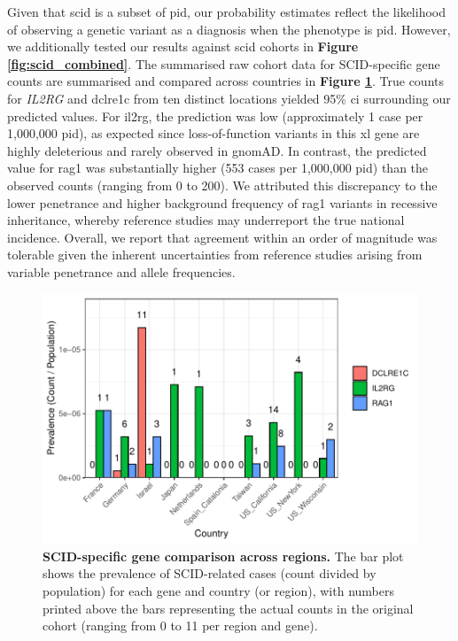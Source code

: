 Given that \ac{scid} is a subset of \ac{pid}, our probability estimates reflect the likelihood of observing a genetic variant as a diagnosis when the phenotype is \ac{pid}. 
However, we additionally tested our results against \ac{scid} cohorts in 
 \textbf{Figure \ref{fig:scid_combined}}.
The summarised raw cohort data for SCID-specific gene counts are summarised and compared across countries in \textbf{Figure \ref{fig:scid_gene_comparison}}.
True counts for \textit{IL2RG} and \ac{dclre1c} from ten distinct locations yielded 95\% \ac{ci} surrounding our predicted values. 
For \ac{il2rg}, the prediction was low (approximately 1 case per 1,000,000 \ac{pid}), as expected since loss-of-function variants in this \ac{xl} gene are highly deleterious and rarely observed in gnomAD. In contrast, the predicted value for \ac{rag1} was substantially higher (553 cases per 1,000,000 \ac{pid}) than the observed counts (ranging from 0 to 200). 
We attributed this discrepancy to the lower penetrance and higher background frequency of \ac{rag1} variants in recessive inheritance, whereby reference studies may underreport the true national incidence. 
Overall, we report that agreement within an order of magnitude was tolerable given the inherent uncertainties from reference studies arising from variable penetrance and allele frequencies.


\begin{figure}[h]
  \centering
  \includegraphics[width=.6\textwidth]{../images/validation_studies_scid_gene_comparison.pdf}
  \caption{\textbf{SCID-specific gene comparison across regions.} The bar plot shows the prevalence of SCID-related cases (count divided by population) for each gene and country (or region), with numbers printed above the bars representing the actual counts in the original cohort (ranging from 0 to 11 per region and gene).}
  \label{fig:scid_gene_comparison}
\end{figure}

